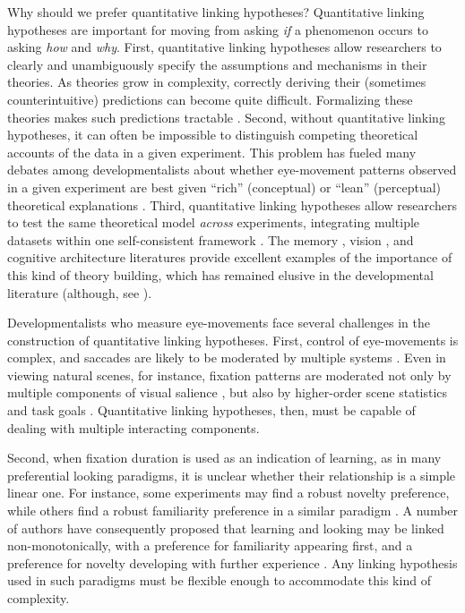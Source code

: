 \documentclass[12pt]{article}
\begin{document}
	Why should we prefer quantitative linking hypotheses? Quantitative linking hypotheses are important for moving from asking \emph{if} a phenomenon occurs to asking \emph{how} and \emph{why}. First, quantitative linking hypotheses allow researchers to clearly and unambiguously specify the assumptions and mechanisms in their theories. As theories grow in complexity, correctly deriving their (sometimes counterintuitive) predictions can become quite difficult. Formalizing these theories makes such predictions tractable \cite{McClelland2009, Shiffrin2010}. Second, without quantitative linking hypotheses, it can often be impossible to distinguish competing theoretical accounts of the data in a given experiment. This problem has fueled many debates among developmentalists about whether eye-movement patterns observed in a given experiment are best given ``rich'' (conceptual) or ``lean'' (perceptual) theoretical explanations \cite{Spelke1998, Aslin2000, Munakata2000}. Third, quantitative linking hypotheses allow researchers to test the same theoretical model \emph{across} experiments, integrating multiple datasets within one self-consistent framework \cite{Aslin2007, Munakata2000,Estes1957, Newell1973}. The memory \cite{Shiffrin1977}, vision \cite{Itti2001}, and cognitive architecture \cite{Anderson1998} literatures provide excellent examples of the importance of this kind of theory building, which has remained elusive in the developmental literature (although, see \cite{Schoner2006}).
	
	Developmentalists who measure eye-movements face several challenges in the construction of quantitative linking hypotheses. First, control of eye-movements is complex, and saccades are likely to be moderated by multiple systems \cite{Aslin2007,  Sirois2004, Hayhoe2005}. Even in viewing natural scenes, for instance, fixation patterns are moderated not only by multiple components of visual salience \cite{Itti2001}, but also by higher-order scene statistics \cite{Torralba2006} and task goals \cite{Hayhoe2005, Castelhano2009}. Quantitative linking hypotheses, then, must be capable of dealing with multiple interacting components.
	
	Second, when fixation duration is used as an indication of learning, as in many preferential looking paradigms, it is unclear whether their relationship is a simple linear one. For instance, some experiments may find a robust novelty preference, while others find a robust familiarity preference in a similar paradigm \cite{Mix2002,Pelucchi2009}. A number of authors have consequently proposed that learning and looking may be linked non-monotonically, with a preference for familiarity appearing first, and a preference for novelty developing with further experience \cite{Hunter1988, Roder2000, Cohen2004, Houston-Price2004}. Any linking hypothesis used in such paradigms must be flexible enough to accommodate this kind of complexity.
	
\end{document}
